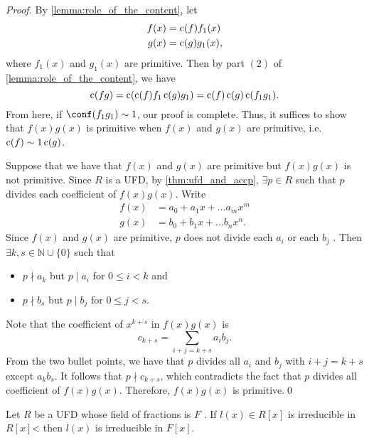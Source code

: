\begin{proof}
  By \cref{lemma:role_of_the_content}, let
  \begin{align*}
    f(x) &= \operatorname{c}(f) f_1(x) \\
    g(x) &= \operatorname{c}(g) g_1(x),
  \end{align*}
  where $f_1(x)$ and $g_1(x)$ are primitive. Then by part $(2)$ of \cref{lemma:role_of_the_content}, we have
  \begin{equation*}
    \operatorname{c}(fg) = \operatorname{c}( \operatorname{c}(f) f_1 \operatorname{c}(g) g_1 ) = \operatorname{c}(f) \operatorname{c}(g) \operatorname{c}( f_1 g_1 ).
  \end{equation*}
  From here, if $\conf( f_1 g_1 ) \sim 1$, our proof is complete. Thus, it suffices to show that $f(x) g(x)$ is primitive when $f(x)$ and $g(x)$ are primitive, i.e. $\operatorname{c}(f) \sim 1 \operatorname{c}(g)$.
  
  Suppose that we have that $f(x)$ and $g(x)$ are primitive but $f(x) g(x)$ is not primitive. Since $R$ is a UFD, by \cref{thm:ufd_and_accp}, $\exists p \in R$ such that $p$ divides each coefficient of $f(x) g(x)$. Write
  \begin{align*}
    f(x) &= a_0 + a_1 x + \hdots a_m x^m \\
    g(x) &= b_0 + b_1 x + \hdots b_n x^n.
  \end{align*}
  Since $f(x)$ and $g(x)$ are primitive, $p$ does not divide each $a_i$ or each $b_j$ . Then $\exists k, s \in \mathbb{N} \cup \{0\}$ such that
  \begin{itemize}
    \item $p \nmid a_k$ but $p \mid a_i$ for $0 \leq i < k$ and
    \item $p \nmid b_s$ but $p \mid b_j$ for $0 \leq j < s$.
  \end{itemize}
  Note that the coefficient of $x^{k + s}$ in $f(x) g(x)$ is
  \begin{equation*}
    c_{k + s} = \sum_{i + j = k + s} a_i b_j.
  \end{equation*}
  From the two bullet points, we have that $p$ divides all $a_i$ and $b_j$ with $i + j = k + s$ except $a_k b_s$. It follows that $p \nmid c_{k + s}$, which contradicts the fact that $p$ divides all coefficient of $f(x) g(x)$. Therefore, $f(x) g(x)$ is primitive.\qed
\end{proof}

\begin{thm}
\label{thm:reducibility_in_the_field_of_fractions}
Let $R$ be a UFD whose field of fractions is $F$ . If $l(x) \in R[x]$ is irreducible in $R[x]$< then $l(x)$ is irreducible in $F[x]$.
\end{thm}

